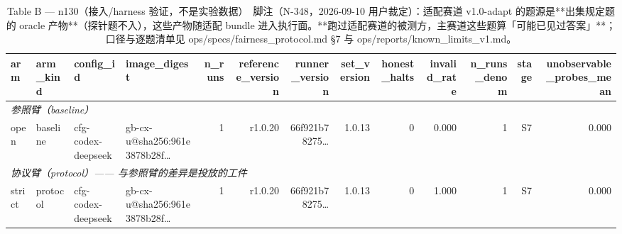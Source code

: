 \begin{table}[t]
\centering
\caption{Table B — n130（接入/harness 验证，不是实验数据）　脚注（N-348，2026-09-10 用户裁定）：适配赛道 v1.0-adapt 的题源是**出集规定题的 oracle 产物**（探针题不入），这些产物随适配 bundle 进入执行面。**跑过适配赛道的被测方，主赛道这些题算「可能已见过答案」**；口径与逐题清单见 ops/specs/fairness\_protocol.md §7 与 ops/reports/known\_limits\_v1.md。}
\label{tab:b-n130}
\begin{tabular}{llllrrrrrrrrr}
\toprule
arm & arm\_kind & config\_id & image\_digest & n\_runs & reference\_version & runner\_version & set\_version & honest\_halts & invalid\_rate & n\_runs\_denom & stage & unobservable\_probes\_mean \\
\midrule
\multicolumn{13}{l}{\textit{参照臂（baseline）}} \\
open & baseline & cfg-codex-deepseek & gb-cx-u@sha256:961e3878b28f… & 1 & r1.0.20 & 66f921b78275… & 1.0.13 & 0 & 0.000 & 1 & S7 & 0.000 \\
\midrule
\multicolumn{13}{l}{\textit{协议臂（protocol）—— 与参照臂的差异是投放的工件}} \\
strict & protocol & cfg-codex-deepseek & gb-cx-u@sha256:961e3878b28f… & 1 & r1.0.20 & 66f921b78275… & 1.0.13 & 0 & 1.000 & 1 & S7 & 0.000 \\
\bottomrule
\end{tabular}
\end{table}

